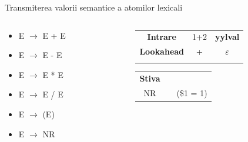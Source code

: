 \documentclass[pdf]{beamer}
\begin{document}
\begin{frame}{Transmiterea valorii semantice a atomilor lexicali}
\begin{columns}
\begin{column}{0.5\textwidth}
\begin{itemize}
	\item
	E $\rightarrow$ E + E

	\item
	E $\rightarrow$ E - E

	\item
	E $\rightarrow$ E * E

	\item
	E $\rightarrow$ E / E

	\item
	E $\rightarrow$ (E)

	\item
	E $\rightarrow$ NR

\end{itemize}
\end{column}

\begin{column}{0.4\textwidth}

\begin{tabular}{ccc|} \cline{1-3}
\multicolumn{1}{|c}{\textbf{Intrare}} & {1+2} & {\textbf{yylval}} \\ \cline{1-3}
\multicolumn{1}{|c}{\textbf{Lookahead}} & + & $\varepsilon$ \\ \cline{1-3} \\
\end{tabular}
\begin{tabular}{cc|c|}
\cline{1-1}
\multicolumn{1}{|c|}{\textbf{Stiva}} & \hspace{0.75cm}\\
\multicolumn{1}{|c|}{NR} & \hspace{0.75cm} & (\$1 = 1)\\
\cline{1-1}
\end{tabular}

\end{column}
\end{columns}
\end{frame}
\end{document}
